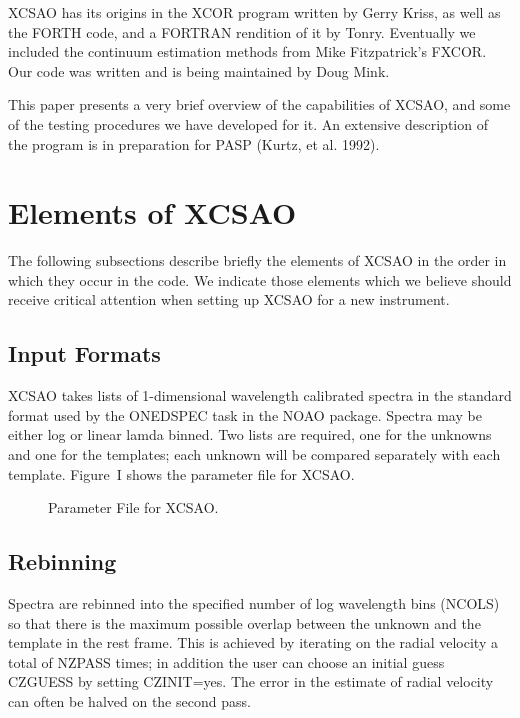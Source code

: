 XCSAO has its origins in the XCOR program written by Gerry Kriss, as well as
the FORTH code, and a FORTRAN rendition of it by Tonry.  Eventually we included
the continuum estimation methods from Mike Fitzpatrick's FXCOR.  Our code was
written and is being maintained by Doug Mink.

This paper presents a very brief overview of the capabilities of XCSAO, and
some of the testing procedures we have developed for it.  An extensive
description of the program is in preparation for PASP (Kurtz, et al. 1992).


\section{Elements of XCSAO}

The following subsections describe briefly the elements of XCSAO in the order
in which they occur in the code.  We indicate those elements which we believe
should receive critical attention when setting up XCSAO for a new instrument.
               
\subsection{Input Formats}

XCSAO takes lists of 1-dimensional wavelength calibrated spectra in the
standard format used by the ONEDSPEC task in the NOAO package.  Spectra may be
either log or linear lamda binned.  Two lists are required, one for the
unknowns and one for the templates; each unknown will be compared separately
with each template.  Figure~I shows the parameter file for XCSAO.

\begin{figure}
\vspace {20cm} 
\caption{Parameter File for XCSAO.}\label{fig-1}
\end{figure}

\subsection{Rebinning}

Spectra are rebinned into the specified number of log wavelength bins (NCOLS) so
that there is the maximum possible overlap between the unknown and the template 
in the rest frame.  This is achieved by iterating on the radial velocity a
total of NZPASS times; in addition the user can choose an initial guess CZGUESS
by setting CZINIT=yes.  The error in the estimate of radial velocity can often
be halved on the second pass.  

